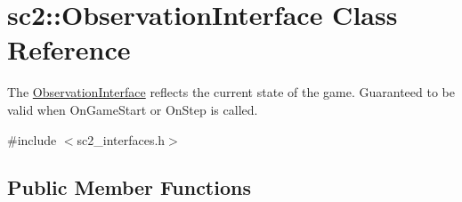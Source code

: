 \hypertarget{classsc2_1_1_observation_interface}{}\section{sc2\+:\+:Observation\+Interface Class Reference}
\label{classsc2_1_1_observation_interface}


The \hyperlink{classsc2_1_1_observation_interface}{Observation\+Interface} reflects the current state of the game. Guaranteed to be valid when On\+Game\+Start or On\+Step is called.  




{\ttfamily \#include $<$sc2\+\_\+interfaces.\+h$>$}

\subsection*{Public Member Functions}
